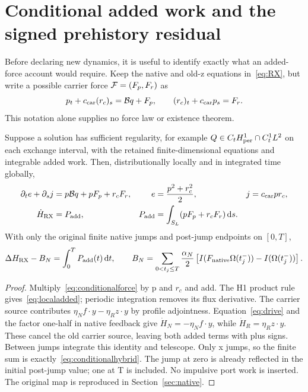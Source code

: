 \section{Conditional added work and the signed prehistory residual}\label{sec:conditional}
Before declaring new dynamics, it is useful to identify exactly what an added-force account would require. Keep the native and old-z equations in~\eqref{eq:RX}, but write a possible carrier force $\mathcal F=(F_p,F_r)$ as
\begin{equation}\label{eq:conditionalforce}
p_t+c_{\rm car}(r_c)_s=\mathcal B q+F_p,\qquad (r_c)_t+c_{\rm car} p_s=F_r.
\end{equation}
This notation alone supplies no force law or existence theorem.

\begin{proposition}\label{prop:conditionalwork}
Suppose a solution has sufficient regularity, for example $Q\in C_tH^1_{\rm per}\cap C_t^1L^2$ on each exchange interval, with the retained finite-dimensional equations and integrable added work. Then, distributionally locally and in integrated time globally,
\begin{align}
\partial_t e+\partial_s j&=p\mathcal B q+pF_p+r_cF_r,
&e&=\frac{p^2+r_c^2}{2},&j&=c_{\rm car} p r_c,\label{eq:localadded}\\
\dot H_{\rm RX}&=P_{\rm add},&P_{\rm add}&=\int_{S_L}(pF_p+r_cF_r)\,\mathrm d s.\label{eq:addedpower}
\end{align}
With only the original finite native jumps and post-jump endpoints on $[0,T]$,
\begin{equation}\label{eq:conditionalhybrid}
\Delta H_{\rm RX}-B_N=\int_0^T P_{\rm add}(t)\,\mathrm d t,\qquad
B_N=\sum_{0<t_j\le T}\frac{\alpha_N}{2}
\left[I(F_{\rm native}\Omega(t_j^-))-I(\Omega(t_j^-))\right].
\end{equation}
\end{proposition}
\begin{proof}
Multiply~\eqref{eq:conditionalforce} by p and $r_c$ and add. The H1 product rule gives~\eqref{eq:localadded}; periodic integration removes its flux derivative. The carrier source contributes $\eta_N f\cdot y-\eta_Rz\cdot y$ by profile adjointness. Equation~\eqref{eq:drive} and the factor one-half in native feedback give $\dot H_N=-\eta_Nf\cdot y$, while $\dot H_R=\eta_Rz\cdot y$. These cancel the old carrier source, leaving both added terms with plus signs. Between jumps integrate this identity and telescope. Only x jumps, so the finite sum is exactly~\eqref{eq:conditionalhybrid}. The jump at zero is already reflected in the initial post-jump value; one at T is included. No impulsive port work is inserted. The original map is reproduced in Section~\ref{sec:native}.
\end{proof}

